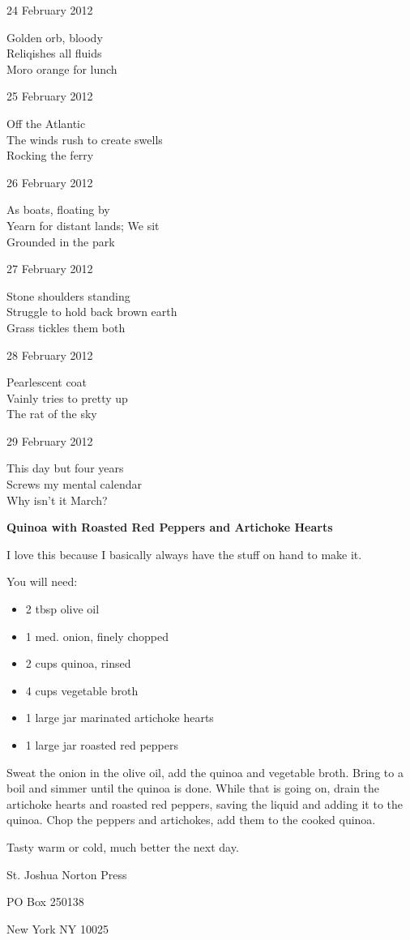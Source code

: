 \documentclass[12pt]{article}
\begin{document}
24 February 2012
 
Golden orb, bloody \\
Reliqishes all fluids \\
Moro orange for lunch

25 February 2012

Off the Atlantic \\
The winds rush to create swells \\
Rocking the ferry

26 February 2012

As boats, floating by \\
Yearn for distant lands; We sit \\
Grounded in the park

27 February 2012

Stone shoulders standing \\
Struggle to hold back brown earth \\
Grass tickles them both

28 February 2012

Pearlescent coat \\
Vainly tries to pretty up \\
The rat of the sky

29 February 2012

This day but four years \\
Screws my mental calendar \\
Why isn't it March?

\newpage
\begin{center}{\bfseries Quinoa with Roasted Red Peppers and Artichoke Hearts}\end{center}

I love this because I basically always have the stuff on hand to make it.

You will need:

\begin{itemize}
    \item 2 tbsp olive oil
    \item 1 med. onion, finely chopped
    \item 2 cups quinoa, rinsed
    \item 4 cups vegetable broth
    \item 1 large jar marinated artichoke hearts
    \item 1 large jar roasted red peppers
\end{itemize}

Sweat the onion in the olive oil, add the quinoa and vegetable broth. Bring to a boil
and simmer until the quinoa is done. While that is going on, drain the artichoke
hearts and roasted red peppers, saving the liquid and adding it to the quinoa. 
Chop the peppers and artichokes, add them to the cooked quinoa.

Tasty warm or cold, much better the next day.

\newpage

\thispagestyle{empty}
\vspace*{12cm}
\begin{sideways}
\Large{St. Joshua Norton Press}
\end{sideways}
\begin{sideways}
\Large{PO Box 250138}
\end{sideways}
\begin{sideways}
\Large{New York NY 10025}
\end{sideways}
\end{document}
